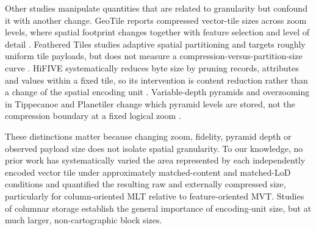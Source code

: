 Other studies manipulate quantities that are related to granularity but confound it
with another change. GeoTile reports compressed vector-tile sizes across zoom levels,
where spatial footprint changes together with feature selection and level of detail
\citep{li2018geotile}. Feathered Tiles studies adaptive spatial partitioning and targets
roughly uniform tile payloads, but does not measure a compression-versus-partition-size
curve \citep{dufilie2014feathered}. HiFIVE systematically reduces byte size by pruning
records, attributes and values within a fixed tile, so its intervention is content
reduction rather than a change of the spatial encoding unit
\citep{bahadori2026hifive}. Variable-depth pyramids and overzooming in Tippecanoe and
Planetiler change which pyramid levels are stored, not the compression boundary at a
fixed logical zoom \citep{tippecanoe, planetiler_1574, planetiler_1286}.

These distinctions matter because changing zoom, fidelity, pyramid depth or observed
payload size does not isolate spatial granularity. To our knowledge, no prior work has
systematically varied the area represented by each independently encoded vector tile
under approximately matched-content and matched-LoD conditions and quantified the
resulting raw and externally compressed size, particularly for column-oriented MLT
relative to feature-oriented MVT. Studies of columnar storage
\citep{abadi2006compression, zeng2023columnar, kuschewski2023btrblocks,
saeedan2022spatialparquet} establish the general importance of encoding-unit size, but
at much larger, non-cartographic block sizes.
